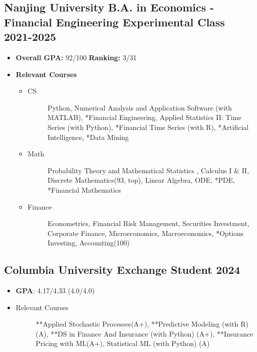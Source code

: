 \documentclass[a4paper]{article}
\begin{document}
\subsection{Nanjing University \normalfont \hfill B.A. in Economics - Financial Engineering Experimental Class  \hfill 2021-2025}
\begin{itemize}
    \item \textbf{Overall GPA:} 92/100 \hfill \textbf{Ranking:} 3/31
    \item \textbf{Relevant Courses}
    \begin{itemize}
        \item\begin{description}
            \item[CS] Python, Numerical Analysis and Application Software (with MATLAB), *Financial Engineering, Applied Statistics II: Time Series (with Python), *\hypertarget{FinTS}{Financial Time Series} (with R), *Artificial Intelligence, *Data Mining
        \end{description}
        \item\begin{description}
            \item[Math] Probability Theory and Mathematical Statistics , Calculus I \& II, Discrete Mathematics(93, top), Linear Algebra, ODE, *PDE, *Financial Mathematics
        \end{description}
        \item\begin{description}
            \item[Finance] Econometrics, Financial Risk Management, Securities Investment, Corporate Finance, Microeconomics, Macroeconomics, *Options Investing, Accounting(100)
        \end{description} 
    \end{itemize} 
\end{itemize}   

\subsection{Columbia University  \normalfont \hfill Exchange Student \hfill 2024}
\begin{itemize}
    \item \textbf{GPA}: 4.17/4.33 (4.0/4.0)
    \item\begin{description}
            \item[Relevant Courses] **Applied Stochastic Processes(A+), \hypertarget{PM}{**Predictive Modeling (with R)}(A), **DS in Finance And Insurance (with Python) (A+), **Insurance Pricing with ML(A+), Statistical ML (with Python) (A)
        \end{description}
\end{itemize}
\end{document}
